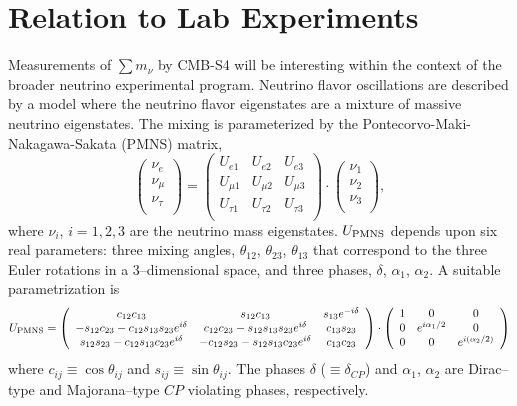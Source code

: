 



\section{Relation to Lab Experiments}\label{sec:lab}

Measurements of $ \sum m_\nu $ by CMB-S4 will be interesting within the context of the broader neutrino experimental program. Neutrino flavor oscillations are described by a model where the neutrino flavor eigenstates are a mixture of massive neutrino eigenstates. The mixing is parameterized by the Pontecorvo-Maki-Nakagawa-Sakata (PMNS) matrix,
\[ \left( \begin{array}{c} \nu_e \\ \nu_{\mu} \\ \nu_{\tau} \\ \end{array} \right) = 
\left( \begin{array}{ccc} U_{e1} & U_{e2} & U_{e3} \\ U_{\mu1} & U_{\mu2} & U_{\mu3} \\ U_{\tau1} & U_{\tau2} & U_{\tau3} \\
\end{array} \right) \cdot
\left( \begin{array}{c} \nu_1 \\ \nu_2 \\ \nu_3 \\ \end{array} \right),
\]
where $\nu_{i}$, $i=1,2,3$ are the neutrino mass eigenstates. $U_{\rm PMNS}$ depends upon six real parameters: three mixing angles, $\theta_{12}$,  $\theta_{23}$, $\theta_{13}$ that
correspond to the three Euler rotations in a 3--dimensional space, and three phases, $\delta$, $\alpha_1$, $\alpha_2$. A suitable parametrization is
\[ U_{\rm PMNS}=
\left( \begin{array}{ccc} c_{12}c_{13} & s_{12}c_{13} & s_{13} e^{-i\delta} \\ 
-s_{12}c_{23} - c_{12}s_{13}s_{23} e^{i\delta} & c_{12}c_{23} - s_{12}s_{13}s_{23} e^{i\delta} & c_{13}s_{23} \\
s_{12}s_{23} - c_{12}s_{13}c_{23} e^{i\delta} & -c_{12}s_{23} - s_{12}s_{13}c_{23} e^{i\delta} & c_{13}c_{23} \\
\end{array} \right) \cdot
\left( \begin{array}{ccc} 1 & 0 & 0 \\ 0 & e^{i\alpha_1/2} & 0 \\ 0 & 0 & e^{i(\alpha_2/2)} \\ 
\end{array} \right)
\]
where $c_{ij} \equiv \cos\theta_{ij}$ and $s_{ij} \equiv \sin\theta_{ij}$. 
The phases $\delta$ ($\equiv \delta_{CP}$) and $\alpha_1$, $\alpha_2$ are Dirac--type and Majorana--type $CP$ violating phases, respectively.

